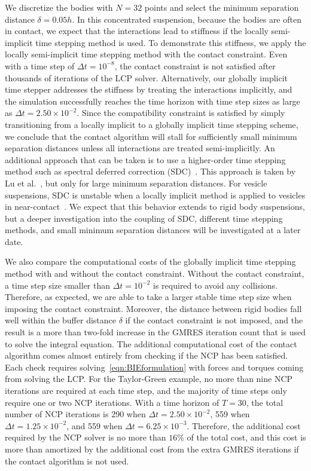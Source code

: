 \documentclass[AMA,STIX1COL]{WileyNJD-v2}
\begin{document}
We discretize the bodies with $N=32$ points and select the minimum
separation distance $\delta=0.05h$.   In this concentrated
suspension, because the bodies are often in contact, we expect that the
interactions lead to stiffness if the locally semi-implicit time
stepping method is used.  To demonstrate this stiffness, we apply the
locally semi-implicit time stepping method with the contact constraint.
Even with a time step of $\Delta t = 10^{-8}$, the contact constraint is
not satisfied after thousands of iterations of the LCP solver.
Alternatively, our globally implicit time stepper addresses the
stiffness by treating the interactions implicitly, and the simulation
successfully reaches the time horizon with time step sizes as large as
$\Delta t = 2.50 \times 10^{-2}$.  Since the compatibility constraint is
satisfied by simply transitioning from a locally implicit to a globally
implicit time stepping scheme, we conclude that the contact algorithm
will stall for sufficiently small minimum separation distances unless
all interactions are treated semi-implicitly.  An additional approach
that can be taken is to use a higher-order time stepping method such as
spectral deferred correction (SDC)~\cite{qua-bir2016}.  This approach is
taken by Lu et al.~\cite{Lu2017}, but only for large minimum separation
distances.  For vesicle suspensions, SDC is unstable when a locally
implicit method is applied to vesicles in
near-contact~\cite{qua-bir2016}. We expect that this behavior extends to
rigid body suspensions, but a deeper investigation into the coupling of
SDC, different time stepping methods, and small minimum separation
distances will be investigated at a later date.

We also compare the computational costs of the globally implicit time
stepping method with and without the contact constraint.  Without the
contact constraint, a time step size smaller than $\Delta t = 10^{-2}$
is required to avoid any collisions.  Therefore, as expected, we are
able to take a larger stable time step size when imposing the contact
constraint.  Moreover, the distance between rigid bodies fall well
within the buffer distance $\delta$ if the contact constraint is not
imposed, and the result is a more than two-fold increase in the GMRES
iteration count that is used to solve the integral equation.  The
additional computational cost of the contact algorithm comes almost
entirely from checking if the NCP has been satisfied.  Each check
requires solving~\eqref{eqn:BIEformulation} with forces and torques
coming from solving the LCP.  For the Taylor-Green example, no more than
nine NCP iterations are required at each time step, and the majority of
time steps only require one or two NCP iterations.  With a time horizon
of $T=30$, the total number of NCP iterations is 290 when $\Delta t =
2.50 \times 10^{-2}$, 559 when $\Delta t = 1.25 \times 10^{-2}$, and 559
when $\Delta t = 6.25 \times 10^{-3}$.  Therefore, the additional cost
required by the NCP solver is no more than $16\%$ of the total cost, and
this cost is more than amortized by the additional cost from the extra GMRES iterations if the
contact algorithm is not used.
\end{document}
